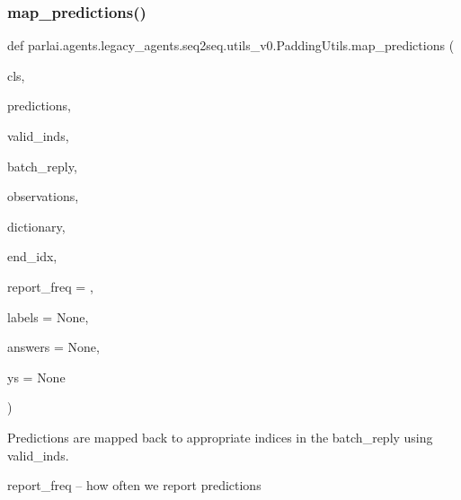 \subsubsection{\texorpdfstring{map\+\_\+predictions()}{map\_predictions()}}
{\footnotesize\ttfamily def parlai.\+agents.\+legacy\+\_\+agents.\+seq2seq.\+utils\+\_\+v0.\+Padding\+Utils.\+map\+\_\+predictions (\begin{DoxyParamCaption}\item[{}]{cls,  }\item[{}]{predictions,  }\item[{}]{valid\+\_\+inds,  }\item[{}]{batch\+\_\+reply,  }\item[{}]{observations,  }\item[{}]{dictionary,  }\item[{}]{end\+\_\+idx,  }\item[{}]{report\+\_\+freq = {},  }\item[{}]{labels = {\ttfamily None},  }\item[{}]{answers = {\ttfamily None},  }\item[{}]{ys = {\ttfamily None} }\end{DoxyParamCaption})}

\begin{DoxyVerb}Predictions are mapped back to appropriate indices in the batch_reply using
valid_inds.

report_freq -- how often we report predictions
\end{DoxyVerb}
 \mbox{\label{classparlai_1_1agents_1_1legacy__agents_1_1seq2seq_1_1utils__v0_1_1PaddingUtils_ae7f9ca3d9fd7dd823895a28af6cae34f}} 
